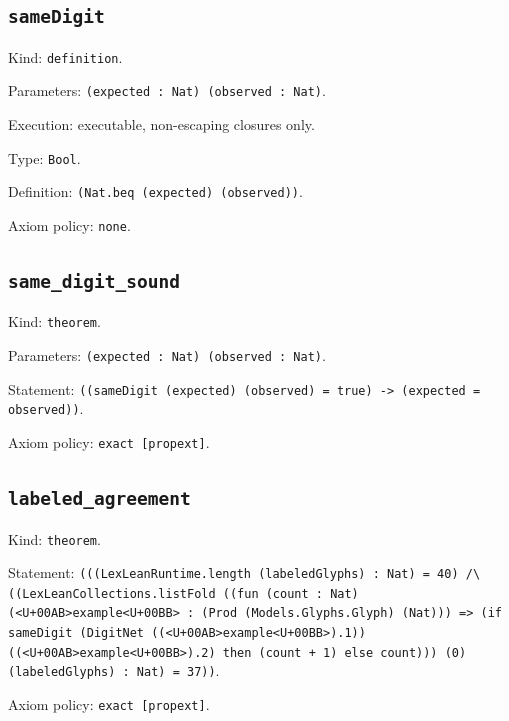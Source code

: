 \documentclass[11pt]{article}
\begin{document}
\subsection*{\texttt{sameDigit}}
\noindent Kind: \texttt{definition}.\par
\noindent Parameters: \texttt{(expected : Nat) (observed : Nat)}.\par
\noindent Execution: executable, non-escaping closures only.\par
\noindent Type: \texttt{Bool}.\par
\noindent Definition: \texttt{(Nat.beq (expected) (observed))}.\par
\noindent Axiom policy: \texttt{none}.\par
\subsection*{\texttt{same\_digit\_sound}}
\noindent Kind: \texttt{theorem}.\par
\noindent Parameters: \texttt{(expected : Nat) (observed : Nat)}.\par
\noindent Statement: \texttt{((sameDigit (expected) (observed) = true) -> (expected = observed))}.\par
\noindent Axiom policy: \texttt{exact [propext]}.\par
\subsection*{\texttt{labeled\_agreement}}
\noindent Kind: \texttt{theorem}.\par
\noindent Statement: \texttt{(((LexLeanRuntime.length (labeledGlyphs) : Nat) = 40) /\textbackslash{} ((LexLeanCollections.listFold ((fun (count : Nat) (<U+00AB>example<U+00BB> : (Prod (Models.Glyphs.Glyph) (Nat))) => (if sameDigit (DigitNet ((<U+00AB>example<U+00BB>).1)) ((<U+00AB>example<U+00BB>).2) then (count + 1) else count))) (0) (labeledGlyphs) : Nat) = 37))}.\par
\noindent Axiom policy: \texttt{exact [propext]}.\par
\end{document}
